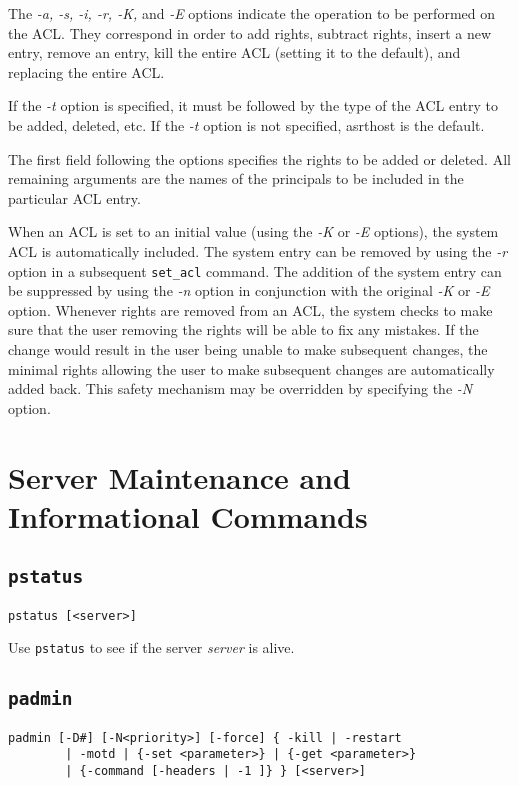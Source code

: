 The {\em -a, -s, -i, -r, -K,} and {\em -E} options indicate the
operation to be performed on the ACL.  They correspond in order to add
rights, subtract rights, insert a new entry, remove an entry, kill the
entire ACL (setting it to the default), and replacing the entire ACL.

If the {\em -t} option is specified, it must be followed by the type
of the ACL entry to be added, deleted, etc.  If the {\em -t} option is
not specified, {\sc asrthost} is the default.

The first field following the options specifies the rights to be added
or deleted.  All remaining arguments are the names of the principals
to be included in the particular ACL entry.

When an ACL is set to an initial value (using the {\em -K} or {\em -E}
options), the {\sc system} ACL is automatically included.  The {\sc
system} entry can be removed by using the {\em -r} option in a
subsequent {\tt set\_acl} command.  The addition of the {\sc system}
entry can be suppressed by using the {\em -n} option in conjunction
with the original {\em -K} or {\em -E} option.  Whenever rights are
removed from an ACL, the system checks to make sure that the user
removing the rights will be able to fix any mistakes.  If the
change would result in the user being unable to make subsequent
changes, the minimal rights allowing the user to make subsequent
changes are automatically added back.  This safety mechanism may be
overridden by specifying the {\em -N} option.

\section{Server Maintenance and Informational Commands}

\subsection{\tt pstatus}

\begin{verbatim}
pstatus [<server>]
\end{verbatim}

Use {\tt pstatus} to see if the server {\em server} is alive.

\subsection{{\tt padmin}}

\begin{verbatim}
padmin [-D#] [-N<priority>] [-force] { -kill | -restart
        | -motd | {-set <parameter>} | {-get <parameter>}
        | {-command [-headers | -1 ]} } [<server>]
\end{verbatim}

